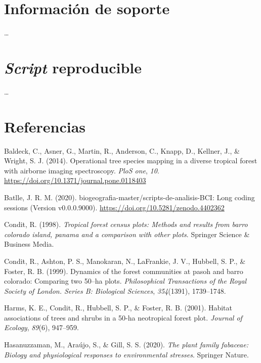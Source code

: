 \documentclass[11pt,]{article}
\begin{document}
\section{Información de soporte}\label{informaciuxf3n-de-soporte}

\ldots

\section{\texorpdfstring{\emph{Script}
reproducible}{Script reproducible}}\label{script-reproducible}

\ldots

\section*{Referencias}\label{referencias}

\hypertarget{refs}{}
\hypertarget{ref-inproceedings}{}
Baldeck, C., Asner, G., Martin, R., Anderson, C., Knapp, D., Kellner,
J., \& Wright, S. J. (2014). Operational tree species mapping in a
diverse tropical forest with airborne imaging spectroscopy. \emph{PloS
one}, \emph{10}. \url{https://doi.org/10.1371/journal.pone.0118403}

\hypertarget{ref-jose_ramon_martinez_batlle_2020_4402362}{}
Batlle, J. R. M. (2020). biogeografia-master/scripts-de-analisis-BCI:
Long coding sessions (Version v0.0.0.9000).
\url{https://doi.org/10.5281/zenodo.4402362}

\hypertarget{ref-condit1998tropical}{}
Condit, R. (1998). \emph{Tropical forest census plots: Methods and
results from barro colorado island, panama and a comparison with other
plots}. Springer Science \& Business Media.

\hypertarget{ref-condit1999dynamics}{}
Condit, R., Ashton, P. S., Manokaran, N., LaFrankie, J. V., Hubbell, S.
P., \& Foster, R. B. (1999). Dynamics of the forest communities at pasoh
and barro colorado: Comparing two 50--ha plots. \emph{Philosophical
Transactions of the Royal Society of London. Series B: Biological
Sciences}, \emph{354}(1391), 1739--1748.

\hypertarget{ref-harms2001habitat}{}
Harms, K. E., Condit, R., Hubbell, S. P., \& Foster, R. B. (2001).
Habitat associations of trees and shrubs in a 50-ha neotropical forest
plot. \emph{Journal of Ecology}, \emph{89}(6), 947--959.

\hypertarget{ref-hasanuzzaman2020plant}{}
Hasanuzzaman, M., Araújo, S., \& Gill, S. S. (2020). \emph{The plant
family fabaceae: Biology and physiological responses to environmental
stresses}. Springer Nature.
\end{document}
